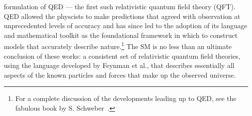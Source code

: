formulation of QED --- the first such relativistic quantum field theory (QFT).
QED allowed the physcists to make predictions that agreed with observation at unprecedented levels
of accuracy and has since led to the adoption of its language and mathematical toolkit as the
foundational framework in which to construct models that accurately describe nature.\footnote{
	For a complete discussion of the developments leading up to QED, see the fabulous
	book by S. Schweber~\cite{Schweber:1994qa}.	
}
The SM is no less than an ultimate conclusion of these works: a consistent set of relativistic
quantum field theories, using the language developed by Feynman et al.,
that describes essentially all aspects of the known particles and forces that make up the 
observed universe.










%
%
%
%





